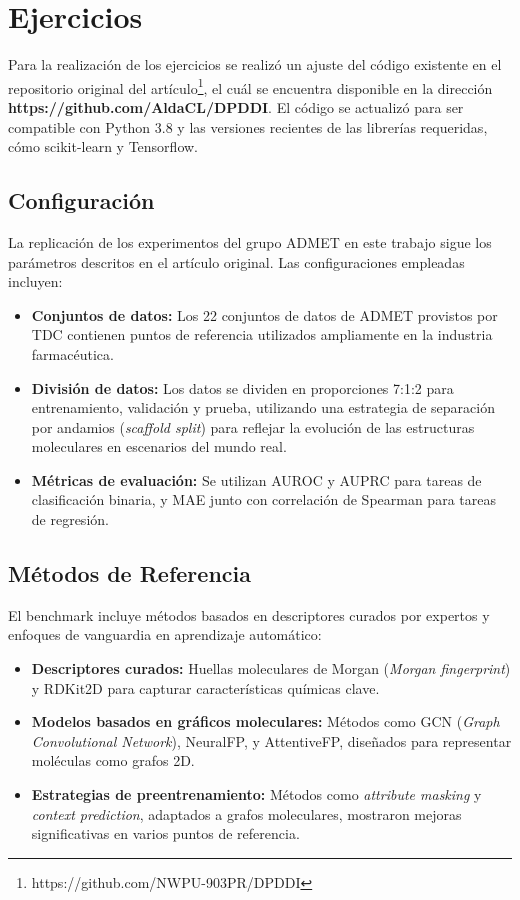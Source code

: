 \chapter{Ejercicios}

Para la realización de los ejercicios se realizó un ajuste del código existente en el repositorio original del artículo\footnote{https://github.com/NWPU-903PR/DPDDI}, el cuál se encuentra disponible en la dirección \textbf{https://github.com/AldaCL/DPDDI}. El código se actualizó para ser compatible con Python 3.8 y las versiones recientes de las librerías requeridas, cómo scikit-learn y Tensorflow.

\section{Configuración}


La replicación de los experimentos del grupo ADMET en este trabajo sigue los parámetros descritos en el artículo original. Las configuraciones empleadas incluyen:

\begin{itemize}
    \item \textbf{Conjuntos de datos:} Los 22 conjuntos de datos de ADMET provistos por TDC contienen puntos de referencia utilizados ampliamente en la industria farmacéutica.
    \item \textbf{División de datos:} Los datos se dividen en proporciones 7:1:2 para entrenamiento, validación y prueba, utilizando una estrategia de separación por andamios (\textit{scaffold split}) para reflejar la evolución de las estructuras moleculares en escenarios del mundo real.
    \item \textbf{Métricas de evaluación:} Se utilizan AUROC y AUPRC para tareas de clasificación binaria, y MAE junto con correlación de Spearman para tareas de regresión.
\end{itemize}

\section{Métodos de Referencia}

El benchmark incluye métodos basados en descriptores curados por expertos y enfoques de vanguardia en aprendizaje automático:

\begin{itemize}
    \item \textbf{Descriptores curados:} Huellas moleculares de Morgan (\textit{Morgan fingerprint}) y RDKit2D para capturar características químicas clave.
    \item \textbf{Modelos basados en gráficos moleculares:} Métodos como GCN (\textit{Graph Convolutional Network}), NeuralFP, y AttentiveFP, diseñados para representar moléculas como grafos 2D.
    \item \textbf{Estrategias de preentrenamiento:} Métodos como \textit{attribute masking} y \textit{context prediction}, adaptados a grafos moleculares, mostraron mejoras significativas en varios puntos de referencia.
\end{itemize}

